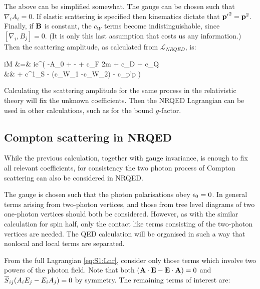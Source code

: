 The above can be simplified somewhat.  The gauge can be chosen such that $\nabla_i A_i = 0$.  If elastic scattering is specified then kinematics dictate that $\mathbf{p'}^2 = \mathbf{p}^2$.   Finally, if $\mathbf{B}$ is constant, the $c_W$ terms become indistinguishable, since $[ \nabla_i, B_j] = 0$.    (It is only this last assumption that costs us any information.)  Then the scattering amplitude, as calculated from $\mathcal{L}_{NRQED}$, is:

\beqa
	iM &=&
		ie\phi^\dagger \Bigg(  -A_0 +   -  
		+ c_F   {2m}   	
		+ c_D 	
		+ c_Q 	
	\\&&	+ c^{1}_S 
		- (c_{W_1} -c_{W_2}) 	
		-  c_{p'p}  \Bigg )\phi
\eeqa

Calculating the scattering amplitude for the same process in the relativistic theory will fix the unknown coefficients.  Then the NRQED Lagrangian can be used in other calculations, such as for the bound $g$-factor. 


\subsection{Compton scattering in NRQED}
While the previous calculation, together with gauge invariance, is enough to fix all relevant coefficients, for consistency the two photon process of Compton scattering can also be considered in NRQED.


The gauge is chosen such that the photon polarisations obey $\epsilon_0 = 0$.  In general terms arising from two-photon vertices, and those from tree level diagrams of two one-photon vertices should both be considered.  However, as with the similar calculation for spin half, only the contact like terms consisting of the two-photon vertices are needed.  The QED calculation will be organised in such a way that nonlocal and local terms are separated. 

From the full Lagrangian \eqref{eq:S1:Lnr}, consider only those terms which involve two powers of the photon field.  Note that both $(\mathbf{A} \cdot \mathbf{E} - \mathbf{E} \cdot \mathbf{A} )=0$ and $\overline{S}_{ij} (A_i E_j - E_i A_j) = 0$ by symmetry.  The remaining terms of interest are:

